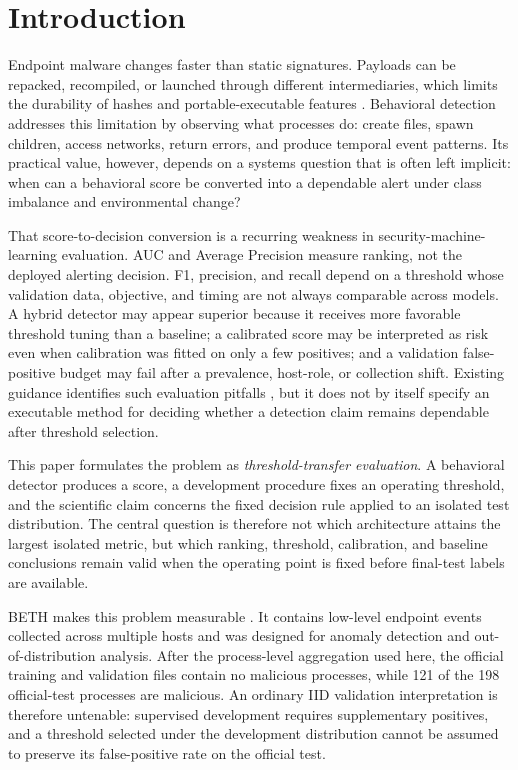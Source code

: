 \documentclass[10pt,journal,compsoc]{IEEEtran}
\begin{document}
\section{Introduction}
\label{sec:intro}

Endpoint malware changes faster than static signatures. Payloads can be repacked, recompiled, or launched through different intermediaries, which limits the durability of hashes and portable-executable features \cite{sikorski2012,anderson2018}. Behavioral detection addresses this limitation by observing what processes do: create files, spawn children, access networks, return errors, and produce temporal event patterns. Its practical value, however, depends on a systems question that is often left implicit: when can a behavioral score be converted into a dependable alert under class imbalance and environmental change?

That score-to-decision conversion is a recurring weakness in security-machine-learning evaluation. AUC and Average Precision measure ranking, not the deployed alerting decision. F1, precision, and recall depend on a threshold whose validation data, objective, and timing are not always comparable across models. A hybrid detector may appear superior because it receives more favorable threshold tuning than a baseline; a calibrated score may be interpreted as risk even when calibration was fitted on only a few positives; and a validation false-positive budget may fail after a prevalence, host-role, or collection shift. Existing guidance identifies such evaluation pitfalls \cite{arp2022}, but it does not by itself specify an executable method for deciding whether a detection claim remains dependable after threshold selection.

This paper formulates the problem as \emph{threshold-transfer evaluation}. A behavioral detector produces a score, a development procedure fixes an operating threshold, and the scientific claim concerns the fixed decision rule applied to an isolated test distribution. The central question is therefore not which architecture attains the largest isolated metric, but which ranking, threshold, calibration, and baseline conclusions remain valid when the operating point is fixed before final-test labels are available.

BETH makes this problem measurable \cite{highnam2021}. It contains low-level endpoint events collected across multiple hosts and was designed for anomaly detection and out-of-distribution analysis. After the process-level aggregation used here, the official training and validation files contain no malicious processes, while 121 of the 198 official-test processes are malicious. An ordinary IID validation interpretation is therefore untenable: supervised development requires supplementary positives, and a threshold selected under the development distribution cannot be assumed to preserve its false-positive rate on the official test.
\end{document}
